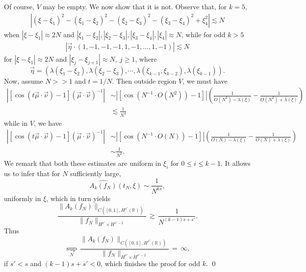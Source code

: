 \documentclass{amsart}
\begin{document}
Of course, $V$ may be empty. We now show that it is not.
Observe that, for $k = 5$, 
\begin{gather*}
  | (\xi - \xi_{1})^{2} - (\xi_{1} - \xi_{2})^{2} - (\xi_{2} - \xi_{3})^{2} - (\xi_{3} - \xi_{4})^{2} + \xi_{4}^{2} | \lesssim N
\end{gather*}
when $|\xi - \xi_{1}| \approx 2N$ and $|
\xi_{1} - \xi_{2}|, |\xi_{2} - \xi_{3}|, |\xi_{3} - \xi_{4}|,  |\xi_{4}| \approx N$, while for odd $k > 5$ 
\begin{gather*}
  |\vec{\eta} \cdot  (1, -1, -1, -1, 1, -1, \dots, 1, -1 )| \lesssim N  
\end{gather*}
for $ |\xi - \xi_{1}| \approx 2N $ and
$| \xi_{j} - \xi_{j+1}| \approx N, \ j \ge 1 $, where
\[\vec{\eta} =   
\left ( \lambda(\xi_{1} - \xi_{2}), \lambda(\xi_{2} - \xi_{3}), \cdots, \lambda(\xi_{k-1}, \xi_{k-2}), \lambda(\xi_{k-1}) \right ).
\]
Now, assume $N >>1$ and $t = 1/{N}$. Then outside region $V$, we must have 
\begin{equation*}
\begin{split}
  | [\cos(t \vec{\mu} \cdot \vec{\nu})-1] (\vec{\mu} \cdot \vec{\nu})^{-1} |
& \sim 
| [\cos(N^{-1} \cdot O(N^{2}))-1] | 
\left ( \frac{1}{O(N^{2}) - \lambda(\xi)} - \frac{1}{O(N^{2})+ \lambda(\xi)} \right )
\\
& \lesssim \frac{1}{N^{4}}
\end{split}
\end{equation*}
while in $V$, we have
\begin{equation*}
\begin{split}
  | [\cos(t \vec{\mu} \cdot \vec{\nu})-1] (\vec{\mu} \cdot \vec{\nu})^{-1} |
& \sim 
| [\cos(N^{-1} \cdot O(N))-1] | 
\left ( \frac{1}{O(N) - \lambda(\xi)} - \frac{1}{O(N)+ \lambda(\xi)} \right )
\\
& \sim \frac{1}{N^{2}}.
\end{split}
\end{equation*}
We remark that both these estimates are uniform in $\xi_{i}$ for $0 \le i \le k-1$.
It allows us to infer that for $N$ sufficiently large,
\[
\widehat{A_{k}(f_N)}(t_N,\xi) \sim \frac{1}{N^{ks}},
\]
uniformly in $\xi$, which in turn yields
\[
\frac{\|A_{k}(f_N)\|_{C([0,1], H^{s'}(\mathbb{R}))}}{\|f_N\|_{H^{s'}\times H^{s'-2}}}\,\gtrsim\, \frac{1}{N^{(k-1)s+s'}}.\]
Thus
\[
\sup_N\,\frac{\|A_{k}(f_N)\|_{C([0,1], H^{s'}(\mathbb{R}))}}{\|f_N\|_{H^{s'}\times H^{s'-2}}}\,=\,\infty,\]
if $s'<s$ and $(k-1)s+s'<0$, which finishes the proof for odd $k$. \qed
\end{document}

